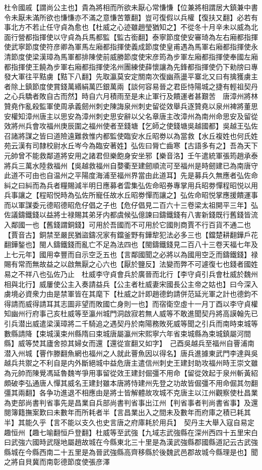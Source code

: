 杜令國戚【謂尚公主也】貴為將相而所欲未厭心常慊慊【位兼將相謂居大鎮兼中書令未厭未滿所欲也慊慊亦不滿之意慊苦簟翻】豈可復假以兵權【復扶又翻】必若有事北方不若止任守貞為愈也【杜威之心迹雖趙瑩猶知之】不從冬十月辛未以威為北面行營都指揮使以守貞為兵馬都監【監古銜翻】泰寧節度使安審琦為左右廂都指揮使武寧節度使符彦卿為軍馬左廂都指揮使義成節度使皇甫遇為馬軍右廂都指揮使永清節度使梁漢璋為馬軍都排陳使前威勝節度使宋彦筠為步軍左廂都指揮使奉國左廂都指揮使王饒為步軍右廂都指揮使洺州團練使薛懷讓為先鋒都指揮使仍下勑牓曰專發大軍往平黠虜【黠下八翻】先取瀛莫安定關南次復幽燕盪平寨北又曰有擒獲虜主者除上鎮節度使賞錢萬緡絹萬匹銀萬兩【談何容易晉之君臣恃陽城之捷有輕祖契丹之心兵驕者敗自古而然】時自六月積雨至是未止軍行及饋運者甚艱苦　唐漳州將林贊堯作亂殺監軍使周承義劒州刺史陳誨泉州刺史留從效舉兵逐贊堯以泉州裨將董思安權知漳州唐主以思安為漳州刺史思安辭以父名章唐主改漳州為南州命思安及留從效將州兵會攻福州庚辰圍之福州使者至錢塘【乞師之使錢塘吳越國都】吳越王弘佐召諸將謀之皆曰道險遠難救惟内都監使臨安水丘昭劵以為當救【水丘複姓也何氏姓苑云漢有司隸校尉水丘岑今為臨安著姓】弘佐曰脣亡齒寒【古語多有之】吾為天下元帥曾不能救鄰道將安用之諸君但樂飽身安坐邪【樂音洛】壬午遣統軍張筠趙承泰將兵三萬水陸救福州【吳越救福州自㜈衢至建劒順流可至福州是時劒建已為南唐守此道不可由也自温州之平陽度海浦至福州界當由此道耳】先是募兵久無應者弘佐命糾之曰糾而為兵者糧賜減半明日應募者雲集弘佐命昭券專掌用兵昭劵憚程昭悦以用兵事讓之【程昭悦時為弘佐所寵任故水丘昭劵憚而讓之】弘佐命昭悦掌應援饋運事而以軍謀委元德昭德昭危仔倡之子也【危仔倡見二百六十三卷梁太祖開平三年】弘佐議鑄鐵錢以益將士禄賜其弟牙内都虞候弘億諫曰鑄鐵錢有八害新錢既行舊錢皆流入鄰國一也【舊錢謂銅錢】可用於吾國而不可用於它國則商賈不行百貨不通二也【賈音古】銅禁至嚴民猶盜鑄况家有鐺釜野有鏵犂犯法必多三也【鐺楚耕翻鏵戶花翻鏵鍫也】閩人鑄鐵錢而亂亡不足為法四也【閩鑄鐵錢見二百八十三卷天福七年及上七元年】國用幸豐而自示空乏五也【言鄰國聞之必將以為國用空乏而鑄鐵錢】禄賜有常而無故益之以啟無厭之心六也【厭於鹽反】法變而弊不可遽復七也錢者國姓易之不祥八也弘佐乃止　杜威李守貞會兵於廣晉而北行【李守貞引兵會杜威於魏州相與北行】威屢使公主入奏請益兵【公主者杜威妻宋國長公主帝之姑也】曰今深入虜境必資衆力由是禁軍皆在其麾下【杜威之計即趙德鈞請併范延光軍之計也德鈞不得請而威得請耳其志圖非望而敗國亡身則一也】而宿衛空虛十一月丁酉以李守貞權知幽州行府事己亥杜威等至瀛州城門洞啟寂若無人威等不敢進聞契丹將高謨翰先已引兵潜出威遣梁漢璋將二千騎追之遇契丹於南陽務敗死威等聞之引兵而南時束城等數縣請降【束城漢束州縣隋曰束城唐屬瀛州宋熙寧六年省束城縣為束城鎮屬河間縣】威等焚其廬舍掠其婦女而還【還從宣翻又如字】　己酉吳越兵至福州自罾浦南潜入州城【罾作滕翻魚網也福州之人就此罾魚因以得名】唐兵進據東武門李達與吳越兵共禦之不利自是内外斷絕城中益危唐主遣信州刺史王建封助攻福州時王崇文雖為元帥而陳覺馮延魯魏岑爭用事留從效王建封倔彊不用命【留從效起于泉州斬黃紹頗破李弘通唐人憚其威名王建封雖本唐將恃建州先登之功故皆倔彊不用命倔其勿翻彊其兩翻】各争功進退不相應由是將士皆解體故攻城不克唐主以江州觀察使杜昌業為吏部尚書判省事先是昌業自兵部尚書判省事出江州【判省事者判尚書省事】及還閱簿籍撫案歎曰未數年而所耗者半【言昌業出入之間未及數年而府庫之積已耗其半】其能久乎【言不能以支久也史言唐之府庫耗於用兵】　契丹主大舉入寇自易定趣恒州【趣七喻翻恒戶登翻】杜威等至武強【九域志武強縣在深州西四十五里宋白曰武強六國時武隧地屬趙故城在今縣東北三十里是為漢武強縣郡國縣道記云古武強縣城在今縣西南二十五里是為晉武強縣高齊移縣於後魏武邑郡故城今縣理是也】聞之將自貝冀而南彰德節度使張彦澤